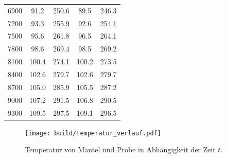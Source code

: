 \begin{table}
\begin{tabular}{c c c c c}
  6900	&	91.2	&	250.6	&	89.5	&	246.3   \\
  7200	&	93.3	&	255.9	&	92.6	&	254.1   \\
  7500	&	95.6	&	261.8	&	96.5	&	264.1   \\
  7800	&	98.6	&	269.4	&	98.5	&	269.2   \\
  8100	&	100.4	&	274.1	&	100.2	&	273.5   \\
  8400	&	102.6	&	279.7	&	102.6	&	279.7   \\
  8700	&	105.0	&	285.9	&	105.5	&	287.2   \\
  9000	&	107.2	&	291.5	&	106.8	&	290.5   \\
  9300	&	109.5	&	297.5	&	109.1	&	296.5   \\
\end{tabular}
\end{table}

\begin{figure}
  \centering
  \texttt{[image: build/temperatur\_verlauf.pdf]}
  \caption{Temperatur von Mantel und Probe in Abhängigkeit der Zeit $t$.}
  \label{fig:T_mess}
\end{figure}


